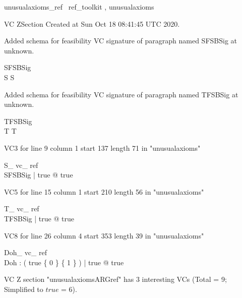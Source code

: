 \documentclass{article}
\begin{document}

\begin{zsection}	 \SECTION unusualaxioms\_ref \parents~ref\_toolkit , unusualaxioms
\end{zsection}

VC ZSection Created at Sun Oct 18 08:41:45 UTC 2020.


Added schema for feasibility VC signature of paragraph named SFSBSig at unknown.
\begin{schema}{SFSBSig}
\\
 S 
\where
 S
\end{schema}


Added schema for feasibility VC signature of paragraph named TFSBSig at unknown.
\begin{schema}{TFSBSig}
\\
 T 
\where
 T
\end{schema}

VC3 for line 9 column 1 start 137 length 71 in "unusualaxioms"
\begin{theorem}{ S\_ vc\_ ref}\\
 \exists SFSBSig | true @ true \\

\end{theorem}

VC5 for line 15 column 1 start 210 length 56 in "unusualaxioms"
\begin{theorem}{ T\_ vc\_ ref}\\
 \exists TFSBSig | true @ true \\

\end{theorem}

VC8 for line 26 column 4 start 353 length 39 in "unusualaxioms"
\begin{theorem}{ Doh\_ vc\_ ref}\\
 \exists Doh : \power ( \IF true \THEN \{ 0 \} \ELSE \{ 1 \} ) | true @ true \\

\end{theorem}



 VC Z section "unusualaxiomsARGref" has $3$ interesting VCs (Total = 9; Simplified to $true$ = 6).



\end{document}
